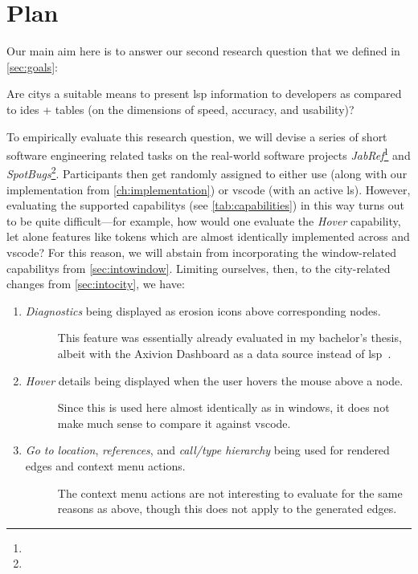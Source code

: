 \documentclass[../thesis]{subfiles}
\begin{document}
\section{Plan}\label{sec:plan}
Our main aim here is to answer our second research question that we defined in \cref{sec:goals}:
\begin{displayquote}
	Are \glspl{city} a suitable means to present \gls{lsp} information to developers as compared to \glspl{ide} + tables (on the dimensions of speed, accuracy, and usability)?
\end{displayquote}

To empirically evaluate this research question, we will devise a series of short software engineering related tasks on the real-world software projects \emph{JabRef}\footnote{
} and \emph{SpotBugs}\footnote{
}.
Participants then get randomly assigned to either use \SEE{} (along with our implementation from \cref{ch:implementation}) or \gls{vscode} (with an active \gls{ls}).
However, evaluating the supported \glspl{capability} (see \cref{tab:capabilities}) in this way turns out to be quite difficult---for example, how would one evaluate the \emph{Hover} \gls{capability}, let alone features like \glspl{token} which are almost identically implemented across \SEE{} and \gls{vscode}?
For this reason, we will abstain from incorporating the \gls{window}-related \glspl{capability} from \cref{sec:intowindow}.
Limiting ourselves, then, to the \gls{city}-related changes from \cref{sec:intocity}, we have:
\begin{enumerate}
	\item \emph{Diagnostics} being displayed as erosion icons above corresponding nodes.
	      \begin{description}
		      \item[\follows{}] This feature was essentially already evaluated in my bachelor's thesis, albeit with the Axivion Dashboard as a data source instead of \gls{lsp}~\cite{galperin2021,galperin2022}.
	      \end{description}
	\item \emph{Hover} details being displayed when the user hovers the mouse above a node.
	      \begin{description}
		      \item[\follows{}] Since this is used here almost identically as in \glspl{window}, it does not make much sense to compare it against \gls{vscode}.
	      \end{description}
	\item \emph{Go to location}, \emph{references}, and \emph{call/type hierarchy} being used for rendered edges and context menu actions.
	      \begin{description}
		      \item[\follows{}] The context menu actions are not interesting to evaluate for the same reasons as above, though this does not apply to the generated edges.
	      \end{description}
\end{enumerate}
\end{document}
